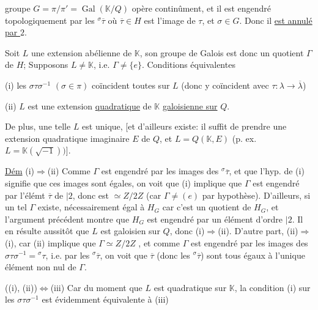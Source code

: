  groupe $G=\pi/\pi'=\operatorname{Gal}(\mathbb K/Q)$ opère continûment, et il est engendré topologiquement par les ${}^{\sigma}\overline\tau$ où $\overline\tau\in H$ est l'image de $\tau$, et $\sigma\in G$. Donc il \uline{est annulé par $2$}.

Soit $L$ une extension abélienne de $\mathbb K$,  son groupe de Galois est donc un quotient $\Gamma$ de $H$;  Supposons $L\ne \mathbb K$, i.e. $\Gamma\ne\{e\}$. Conditions équivalentes

(i) les $\sigma\tau\sigma^{-1}$ $(\sigma\in\pi)$ coïncident toutes sur $L$ (donc y coïncident avec $\tau:\lambda\to\overline\lambda$)

(ii) $L$ est une extension \uline{quadratique} de $\mathbb K$ \uline{galoisienne sur} $Q$.


De plus, une telle $L$  est unique, [et d'ailleurs existe: il suffit de prendre une extension quadratique imaginaire $E$ de $Q$,  et $L=Q(\mathbb K,E)$ (p. ex. $L=\mathbb K(\sqrt{-1}))$].

\uline{Dém} (i)$\Rightarrow$(ii) Comme $\Gamma$ est engendré par les images  des ${}^{\sigma}\overline\tau$,  et que l'hyp. de (i) signifie que ces images sont égales, on voit que (i) implique que $\Gamma$ est engendré par l'élémt $\overline\tau$ de  $|2$, donc est $\simeq Z/2Z$ (car $\Gamma\ne(e)$ par hypothèse). D'ailleurs, si un tel $\Gamma$ existe,   nécessairement égal à $H_G$ car  c'est un quotient de $H_G$, et l'argument précédent montre que  $H_G$ est engendré par un élément d'ordre $|2$.   Il en résulte aussitôt que $L$ est galoisien sur $Q$, donc (i)$\Rightarrow$(ii). D'autre part, (ii)$\Rightarrow$(i), car (ii) implique que $\Gamma\simeq Z/2Z$ , et comme $\Gamma$ est engendré par les images des $\sigma\tau\sigma^{-1}={}^{\sigma}\tau$, i.e. par les ${}^{\sigma}\overline\tau$, on voit que $\overline\tau$ (donc les ${}^{\sigma}\overline\tau$) sont tous égaux à l'unique élément non nul de $\Gamma$.

((i), (ii))$\Longleftrightarrow$(iii) Car du moment que $L$ est quadratique sur $\mathbb K$, la condition (i) sur les $\sigma\tau\sigma^{-1}$ est évidemment équivalente à (iii)
